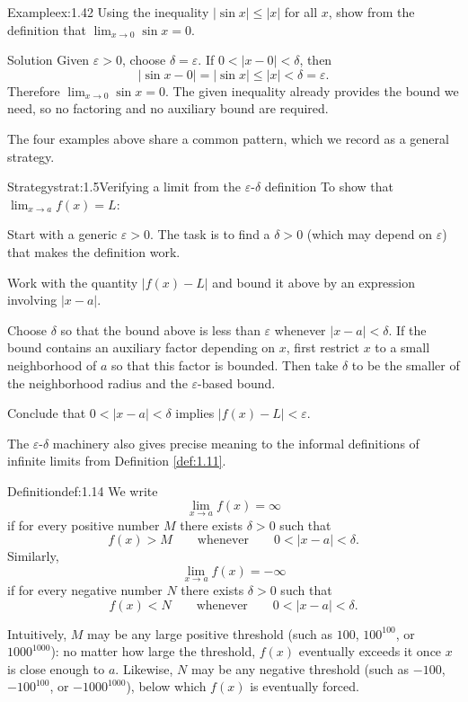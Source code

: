 \documentclass[a4paper,12pt,oneside]{memoir}
\begin{document}
\begin{workedexample}
\begin{envexample}{Example}{ex:1.42}{}
Using the inequality \(|\sin x| \le |x|\) for all \(x\), show from the definition that \(\lim_{x \to 0} \sin x = 0\).
\end{envexample}
\begin{envsolution}{Solution}{}{}
Given \(\varepsilon > 0\), choose \(\delta = \varepsilon\). If \(0 < |x - 0| < \delta\), then \[ |\sin x - 0| = |\sin x| \le |x| < \delta = \varepsilon. \] Therefore \(\lim_{x \to 0} \sin x = 0\). The given inequality already provides the bound we need, so no factoring and no auxiliary bound are required.
\end{envsolution}
\end{workedexample}
The four examples above share a common pattern, which we record as a general strategy.

\begin{envstrategy}{Strategy}{strat:1.5}{Verifying a limit from the \(\varepsilon\)-\(\delta\) definition}
To show that \(\lim_{x \to a} f(x) = L\):

\begin{steps}
  \item Start with a generic \(\varepsilon > 0\). The task is to find a \(\delta > 0\) (which may depend on \(\varepsilon\)) that makes the definition work.
  \item Work with the quantity \(|f(x) - L|\) and bound it above by an expression involving \(|x - a|\).
  \item Choose \(\delta\) so that the bound above is less than \(\varepsilon\) whenever \(|x - a| < \delta\). If the bound contains an auxiliary factor depending on \(x\), first restrict \(x\) to a small neighborhood of \(a\) so that this factor is bounded. Then take \(\delta\) to be the smaller of the neighborhood radius and the \(\varepsilon\)-based bound.
  \item Conclude that \(0 < |x - a| < \delta\) implies \(|f(x) - L| < \varepsilon\).
\end{steps}
\end{envstrategy}
The \(\varepsilon\)-\(\delta\) machinery also gives precise meaning to the informal definitions of infinite limits from Definition \ref{def:1.11}.

\begin{envdefinition}{Definition}{def:1.14}{}
We write \[ \lim_{x \to a} f(x) = \infty \] if for every positive number \(M\) there exists \(\delta > 0\) such that \[ f(x) > M \qquad \text{whenever} \qquad 0 < |x - a| < \delta. \] Similarly, \[ \lim_{x \to a} f(x) = -\infty \] if for every negative number \(N\) there exists \(\delta > 0\) such that \[ f(x) < N \qquad \text{whenever} \qquad 0 < |x - a| < \delta. \]
\end{envdefinition}
Intuitively, \(M\) may be any large positive threshold (such as \(100\), \(100^{100}\), or \(1000^{1000}\)): no matter how large the threshold, \(f(x)\) eventually exceeds it once \(x\) is close enough to \(a\). Likewise, \(N\) may be any negative threshold (such as \(-100\), \(-100^{100}\), or \(-1000^{1000}\)), below which \(f(x)\) is eventually forced.
\end{document}
